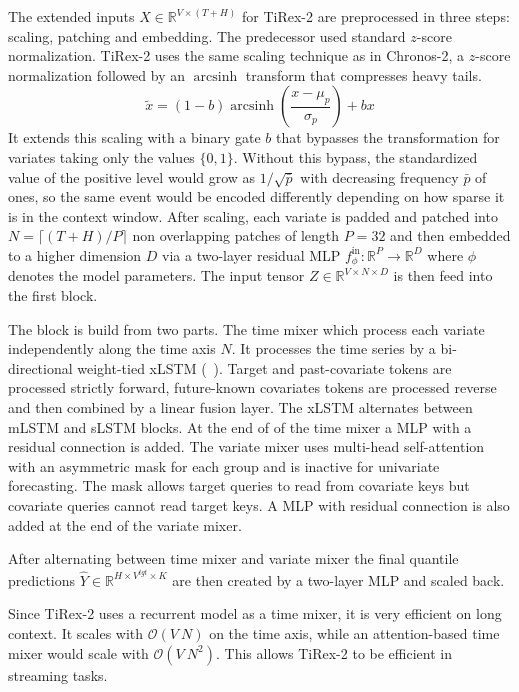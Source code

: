 The extended inputs $X \in \mathbb{R}^{V \times (T+H)}$ for TiRex-2 are preprocessed in three steps: scaling, patching and embedding. The predecessor used standard $z$-score normalization. TiRex-2 uses the same scaling technique as in Chronos-2, a $z$-score normalization followed by an $\operatorname{arcsinh}$ transform that compresses heavy tails.
\begin{equation}
	\label{eq:binary_aware_scaling}
	\tilde{x} = (1-b)\operatorname{arcsinh}\left(\dfrac{x - \mu_p}{\sigma_p} \right) + bx
\end{equation}
It extends this scaling with a binary gate $b$ that bypasses the transformation for variates taking only the values $\{0, 1\}$. Without this bypass, the standardized value of the positive level would grow as $1/\sqrt{\bar{p}}$ with decreasing frequency $\bar{p}$ of ones, so the same event would be encoded differently depending on how sparse it is in the context window. After scaling, each variate is padded and patched into $N = \lceil (T + H) / P \rceil$ non overlapping patches of length $P=32$ and then embedded to a higher dimension $D$ via a two-layer residual MLP $f_{\phi}^{\text{in}}: \mathbb{R}^{P} \to \mathbb{R}^D$ where $\phi$ denotes the model parameters. The input tensor $Z \in \mathbb{R}^{V \times N \times D}$ is then feed into the first block.

The block is build from two parts. The time mixer which process each variate independently along the time axis $N$. It processes the time series by a bi-directional weight-tied xLSTM (\citeauthor{bixlstm}~\cite{bixlstm}). Target and past-covariate tokens are processed strictly forward, future-known covariates tokens are processed reverse and then combined by a linear fusion layer. The xLSTM alternates between mLSTM and sLSTM blocks. At the end of of the time mixer a MLP with a residual connection is added.
The variate mixer uses multi-head self-attention with an asymmetric mask for each group and is inactive for univariate forecasting. The mask allows target queries to read from covariate keys but covariate queries cannot read target keys. A MLP with residual connection is also added at the end of the variate mixer.

After alternating between time mixer and variate mixer the final quantile predictions $\hat{Y} \in \mathbb{R}^{H \times V^{tgt} \times K}$ are then created by a two-layer MLP and scaled back.

Since TiRex-2 uses a recurrent model as a time mixer, it is very efficient on long context. It scales with $\mathcal{O}(V \ N)$ on the time axis, while an attention-based time mixer would scale with $\mathcal{O}(V \ N^2)$. This allows TiRex-2 to be efficient in streaming tasks.


